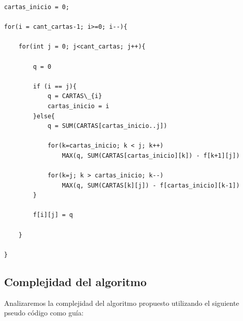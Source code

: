 \begin{lstlisting}
cartas_inicio = 0;

for(i = cant_cartas-1; i>=0; i--){

	for(int j = 0; j<cant_cartas; j++){
		
		q = 0
		
		if (i == j){
			q = CARTAS\_{i}
			cartas_inicio = i
		}else{
			q = SUM(CARTAS[cartas_inicio..j])
			
			for(k=cartas_inicio; k < j; k++)
				MAX(q, SUM(CARTAS[cartas_inicio][k]) - f[k+1][j])
			
			for(k=j; k > cartas_inicio; k--)
				MAX(q, SUM(CARTAS[k][j]) - f[cartas_inicio][k-1])
		}		
		
		f[i][j] = q
		
	}

}
\end{lstlisting}

\newpage 

\subsection{Complejidad del algoritmo}

Analizaremos la complejidad del algoritmo propuesto utilizando el siguiente pseudo c\'odigo como gu\'ia: \\

